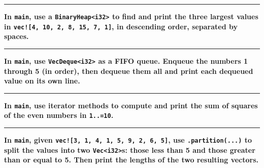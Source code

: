 \documentclass[
  11pt,
]{article}
\newenvironment{Shaded}{}{}
\begin{document}
\begin{center}\rule{0.5\linewidth}{0.5pt}\end{center}

\textbf{In \texttt{main}, use a
\texttt{BinaryHeap\textless{}i32\textgreater{}} to find and print the
three largest values in \texttt{vec!{[}4,\ 10,\ 2,\ 8,\ 15,\ 7,\ 1{]}},
in descending order, separated by spaces.}

\begin{Shaded}
\begin{Highlighting}[]


\end{Highlighting}
\end{Shaded}

\begin{center}\rule{0.5\linewidth}{0.5pt}\end{center}

\textbf{In \texttt{main}, use
\texttt{VecDeque\textless{}i32\textgreater{}} as a FIFO queue. Enqueue
the numbers 1 through 5 (in order), then dequeue them all and print each
dequeued value on its own line.}

\begin{Shaded}
\begin{Highlighting}[]


\end{Highlighting}
\end{Shaded}

\begin{center}\rule{0.5\linewidth}{0.5pt}\end{center}

\textbf{In \texttt{main}, use iterator methods to compute and print the
sum of squares of the even numbers in \texttt{1..=10}.}

\begin{Shaded}
\begin{Highlighting}[]


\end{Highlighting}
\end{Shaded}

\begin{center}\rule{0.5\linewidth}{0.5pt}\end{center}

\textbf{In \texttt{main}, given
\texttt{vec!{[}3,\ 1,\ 4,\ 1,\ 5,\ 9,\ 2,\ 6,\ 5{]}}, use
\texttt{.partition(...)} to split the values into two
\texttt{Vec\textless{}i32\textgreater{}}s: those less than 5 and those
greater than or equal to 5. Then print the lengths of the two resulting
vectors.}
\end{document}
